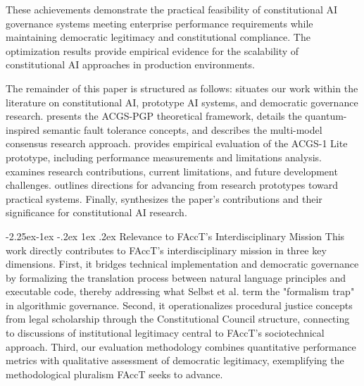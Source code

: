 \documentclass[manuscript,screen,9pt]{acmart}
\makeatletter
\renewcommand\subsection{\@startsection{subsection}{2}{\z@}%
  {-2.25ex\@plus -1ex \@minus -.2ex}%
  {1ex \@plus .2ex}%
  {\normalfont\large\bfseries}}
\makeatother
\begin{document}
These achievements demonstrate the practical feasibility of constitutional AI governance systems meeting enterprise performance requirements while maintaining democratic legitimacy and constitutional compliance. The optimization results provide empirical evidence for the scalability of constitutional AI approaches in production environments.

The remainder of this paper is structured as follows:  situates our work within the literature on constitutional AI, prototype AI systems, and democratic governance research.  presents the ACGS-PGP theoretical framework, details the quantum-inspired semantic fault tolerance concepts, and describes the multi-model consensus research approach.  provides empirical evaluation of the ACGS-1 Lite prototype, including performance measurements and limitations analysis.  examines research contributions, current limitations, and future development challenges.  outlines directions for advancing from research prototypes toward practical systems. Finally,  synthesizes the paper's contributions and their significance for constitutional AI research.

\subsection{Relevance to FAccT's Interdisciplinary Mission}
\label{subsec:facct_relevance}
This work directly contributes to FAccT's interdisciplinary mission in three key dimensions. First, it bridges technical implementation and democratic governance by formalizing the translation process between natural language principles and executable code, thereby addressing what Selbst et al. \cite{Selbst2019FairnessAccountability} term the "formalism trap" in algorithmic governance. Second, it operationalizes procedural justice concepts from legal scholarship through the Constitutional Council structure, connecting to discussions of institutional legitimacy central to FAccT's sociotechnical approach. Third, our evaluation methodology combines quantitative performance metrics with qualitative assessment of democratic legitimacy, exemplifying the methodological pluralism FAccT seeks to advance.
\end{document}
